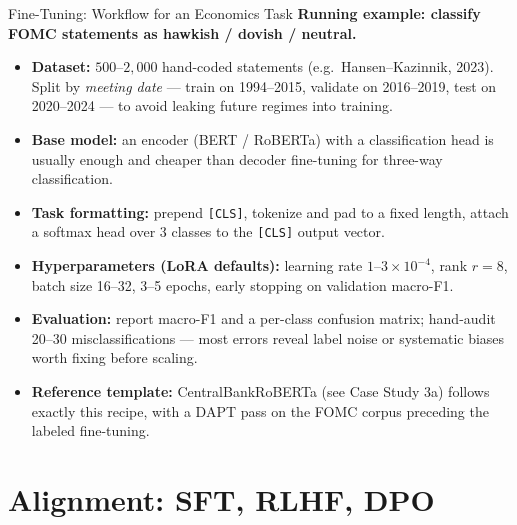 \begin{frame}{Fine-Tuning: Workflow for an Economics Task}
\textbf{Running example: classify FOMC statements as hawkish / dovish / neutral.}
\begin{itemize}
\item \textbf{Dataset:} $500$--$2{,}000$ hand-coded statements (e.g.\ Hansen--Kazinnik, 2023). Split by \emph{meeting date} --- train on 1994--2015, validate on 2016--2019, test on 2020--2024 --- to avoid leaking future regimes into training.

\medskip
\item \textbf{Base model:} an encoder (BERT / RoBERTa) with a classification head is usually enough and cheaper than decoder fine-tuning for three-way classification.

\medskip
\item \textbf{Task formatting:} prepend \texttt{[CLS]}, tokenize and pad to a fixed length, attach a softmax head over 3 classes to the \texttt{[CLS]} output vector.

\medskip
\item \textbf{Hyperparameters (LoRA defaults):} learning rate $1$--$3 \times 10^{-4}$, rank $r = 8$, batch size 16--32, 3--5 epochs, early stopping on validation macro-F1.

\medskip
\item \textbf{Evaluation:} report macro-F1 and a per-class confusion matrix; hand-audit 20--30 misclassifications --- most errors reveal label noise or systematic biases worth fixing before scaling.

\medskip
\item \textbf{Reference template:} CentralBankRoBERTa (see Case Study 3a) follows exactly this recipe, with a DAPT pass on the FOMC corpus preceding the labeled fine-tuning.
\end{itemize}
\end{frame}

\section{Alignment: SFT, RLHF, DPO}


